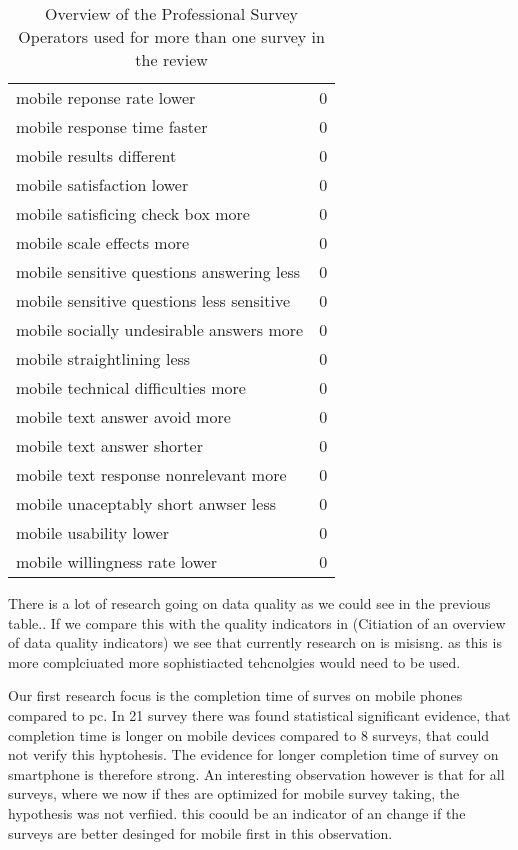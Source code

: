 \begin{table}
\begin{tabular}{ll}
        mobile reponse rate lower    & 0  \\
        mobile response time faster    & 0  \\
        mobile results different    & 0  \\
        mobile satisfaction lower    & 0  \\
        mobile satisficing check box more    & 0  \\
        mobile scale effects more    & 0  \\
        mobile sensitive questions answering less    & 0  \\
        mobile sensitive questions less sensitive    & 0  \\
        mobile socially undesirable answers more    & 0  \\
        mobile straightlining less    & 0  \\
        mobile technical difficulties more    & 0  \\
        mobile text answer avoid more    & 0  \\
        mobile text answer shorter    & 0  \\
        mobile text response nonrelevant more    & 0  \\
        mobile unaceptably short anwser less    & 0  \\
        mobile usability lower    & 0  \\
        mobile willingness rate lower & 0 \\
		\bottomrule 
	\end{tabular}
	\caption{Overview of the Professional Survey Operators used for more than one survey in the review}
	\label{tab: author}
\end{table}

There is a lot of research going on data quality as we could see in the previous table.. If we compare this with the quality indicators in (Citiation of an overview of data quality indicators) we see that currently research on is misisng. as this is more complciuated more sophistiacted tehcnolgies would need to be used. 

Our first research focus is the completion time of surves on mobile phones compared to pc. In 21 survey there was found statistical significant evidence, that completion time is longer on mobile devices compared to 8 surveys, that could not verify this hyptohesis. The evidence for longer completion time of survey on smartphone is therefore strong. An interesting observation however is that for all surveys, where we now if thes are optimized for mobile survey taking, the hypothesis was not verfiied. this coould be an indicator of an change if the surveys are better desinged for mobile first in this observation.


